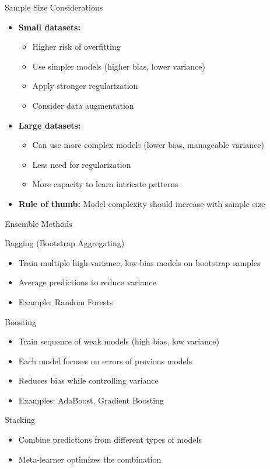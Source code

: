 \documentclass{beamer}
\begin{document}
\begin{frame}{Sample Size Considerations}
  \begin{itemize}
    \item \textbf{Small datasets:}
    \begin{itemize}
      \item Higher risk of overfitting
      \item Use simpler models (higher bias, lower variance)
      \item Apply stronger regularization
      \item Consider data augmentation
    \end{itemize}
    
    \item \textbf{Large datasets:}
    \begin{itemize}
      \item Can use more complex models (lower bias, manageable variance)
      \item Less need for regularization
      \item More capacity to learn intricate patterns
    \end{itemize}
    
    \item \textbf{Rule of thumb:} Model complexity should increase with sample size
  \end{itemize}
\end{frame}

\begin{frame}{Ensemble Methods}
  \begin{block}{Bagging (Bootstrap Aggregating)}
    \begin{itemize}
      \item Train multiple high-variance, low-bias models on bootstrap samples
      \item Average predictions to reduce variance
      \item Example: Random Forests
    \end{itemize}
  \end{block}
  
  \begin{block}{Boosting}
    \begin{itemize}
      \item Train sequence of weak models (high bias, low variance)
      \item Each model focuses on errors of previous models
      \item Reduces bias while controlling variance
      \item Examples: AdaBoost, Gradient Boosting
    \end{itemize}
  \end{block}
  
  \begin{block}{Stacking}
    \begin{itemize}
      \item Combine predictions from different types of models
      \item Meta-learner optimizes the combination
    \end{itemize}
  \end{block}
\end{frame}
\end{document}
